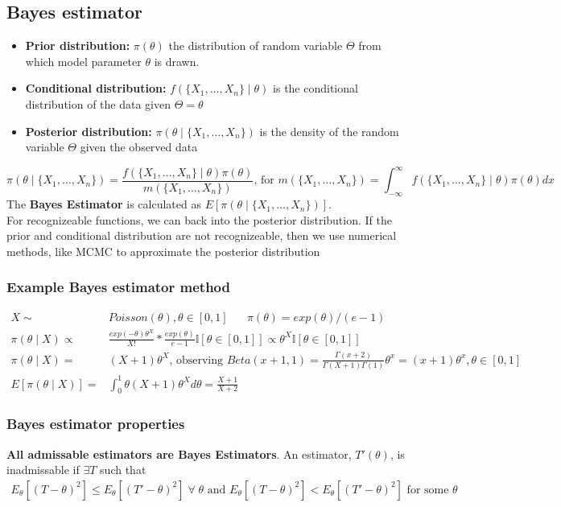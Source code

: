 \documentclass{article}
\begin{document}
\subsection{Bayes estimator}
\begin{itemize}
    \item \textbf{Prior distribution:} $\pi(\theta)$ the distribution of random variable $\Theta$ from which model parameter $\theta$ is drawn.
    \item \textbf{Conditional distribution:} $f(\{X_1, \dots, X_n\}\mid \theta)$ is the conditional distribution of the data given $\Theta = \theta$
    \item \textbf{Posterior distribution:} $\pi(\theta \mid \{X_1, \dots, X_n\})$ is the density of the random variable $\Theta$ given the observed data
\end{itemize}
\begin{equation*}
    \pi(\theta \mid \{X_1, \dots, X_n\}) = \frac{f(\{X_1, \dots, X_n\} \mid \theta)\pi(\theta)}{m(\{X_1, \dots, X_n\})} \textrm{, for } m(\{X_1, \dots, X_n\}) = \int_{-\infty}^\infty f(\{X_1, \dots, X_n\} \mid \theta)\pi(\theta)dx
\end{equation*}
The \textbf{Bayes Estimator} is calculated as $E[\pi(\theta \mid \{X_1, \dots, X_n\})]$.\\
For recognizeable functions, we can back into the posterior distribution. If the prior and conditional distribution are not recognizeable, then we use numerical methods, like MCMC to approximate the posterior distribution
\subsubsection{Example Bayes estimator method}
\begin{align*}
    X \sim& Poisson(\theta), \theta \in [0,1] \;\;\;\;\;\; \pi(\theta) = exp(\theta)/(e-1)\\
    \pi(\theta \mid X) \propto& \frac{exp(-\theta)\theta^X}{X!}*\frac{exp(\theta)}{e-1}\mathbb{I}[\theta \in [0,1]] \propto \theta^X\mathbb{I}[\theta \in [0,1]]\\
    \pi(\theta \mid X) =& (X+1)\theta^X \textrm{, observing } Beta(x+1, 1) = \frac{\Gamma(x + 2)}{\Gamma(X+1)\Gamma(1)}\theta^x = (x+1)\theta^x, \theta \in [0,1]\\
    E[\pi(\theta \mid X)] =& \int_0^1 \theta (X+1)\theta^Xd\theta = \frac{X + 1}{X + 2}
\end{align*}
\subsubsection{Bayes estimator properties}
\textbf{All admissable estimators are Bayes Estimators}. An estimator, $T'(\theta)$, is inadmissable if $\exists T$ such that
\begin{align*}
    E_\theta[(T - \theta)^2] \leq E_\theta[(T' - \theta)^2] \;\forall\; \theta \textrm{  and  }
    E_\theta[(T - \theta)^2] < E_\theta[(T' - \theta)^2] \textrm{ for some } \theta
\end{align*}
\end{document}
